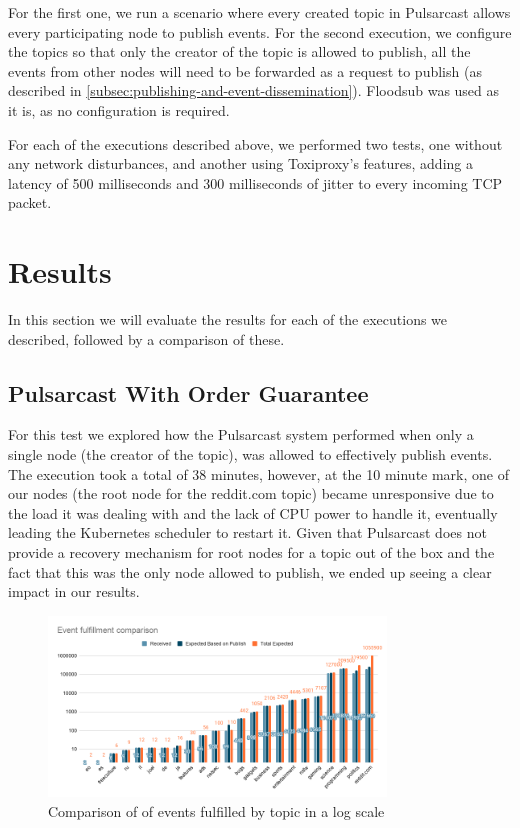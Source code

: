 For the first one, we run a scenario where every created topic in
Pulsarcast allows every participating node to publish events. For the second
execution, we configure the topics so that only the creator of the topic is
allowed to publish, all the events from other nodes will need to be forwarded
as a request to publish (as described in
\ref{subsec:publishing-and-event-dissemination}). Floodsub was used as it is,
as no configuration is required. 

For each of the executions described above, we performed two tests, one without
any network disturbances, and another using Toxiproxy's features, adding a
latency of 500 milliseconds and 300 milliseconds of jitter to every incoming
TCP packet. 

\section{Results}\label{results}

In this section we will evaluate the results for each of the executions we
described, followed by a comparison of these.

\subsection{Pulsarcast With Order Guarantee}\label{subsec:pulsarcast-with-order-guarantee}

For this test we explored how the Pulsarcast system performed when only a
single node (the creator of the topic), was allowed to effectively publish
events. The execution took a total of 38 minutes, however, at the 10 minute
mark, one of our nodes (the root node for the reddit.com topic) became
unresponsive due to the load it was dealing with and the lack of CPU power to
handle it, eventually leading the Kubernetes scheduler to restart it.  Given
that Pulsarcast does not provide a recovery mechanism for root nodes for a
topic out of the box and the fact that this was the only node allowed to
publish, we ended up seeing a clear impact in our results.

\begin{figure}[hb!]
  \centering
  \includegraphics[width=0.8\textwidth]{img/graph-pulsarcast-order-event-fulfillment-comparison.png}
  \caption{Comparison of of events fulfilled by topic in a log scale}
  \label{fig:graph-pulsarcast-order-event-fulfillment-comparison}
\end{figure}


